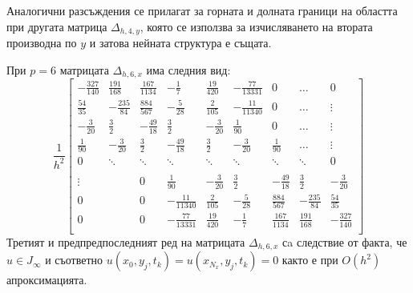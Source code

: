 \documentclass{article}
\begin{document}
Аналогични разсъждения се прилагат за горната и долната граници на областта при другата матрица $\Delta_{h,4,y}$, която се използва за изчисляването на втората производна по $y$ и затова нейната структура е същата.

При $p=6$ матрицата $\Delta_{h,6,x}$ има следния вид:
\[
\frac{1}{h^2}
\begin{bmatrix}
   -\frac{327}{140}	& \frac{191}{168}	&   \frac{167}{1134}	& -\frac{1}{7}    		 & \frac{19}{420}	& -\frac{77}{13331}   &    0      	   	&   \dots           & 0    \\
    \frac{54}{35}    	&-\frac{235}{84}   	&    \frac{884}{567}    &-\frac{5}{28}  	 	& \frac{2}{105}		&  -\frac{11}{11340}	 &   0      	   	&   \dots	       & \vdots  \\
    -\frac{3}{20}		& \frac{3}{2}         	& -\frac{49}{18} 	&  \frac{3}{2}		&  -\frac{3}{20}    	 &   \frac{1}{90}    	 &  0			&     \dots         &\vdots    \\
    \frac{1}{90}		& -\frac{3}{20}		& \frac{3}{2}         	& -\frac{49}{18} 	&  \frac{3}{2}		&  -\frac{3}{20}    	 &   \frac{1}{90} &     \dots         &\vdots    \\
        0           		& \ddots        		&         \ddots           	& \ddots        		&    \ddots   		&   \ddots      		 &     \ddots    	&  \ddots          &    0 \\	
\\
   \vdots      		&            		 	&    	0	      		& \frac{1}{90}		& -\frac{3}{20}		& \frac{3}{2}         	& -\frac{49}{18}	&  \frac{3}{2}  &  -\frac{3}{20} \\
    0      			&              	 	&    0      		&   -\frac{11}{11340}	 	&    \frac{2}{105} 	&  -\frac{5}{28} 	& \frac{884}{567} &-\frac{235}{84} &  \frac{54}{35}\\
    0              	& 	          		&    0              	&  -\frac{77}{13331}    		&  \frac{19}{420}&-\frac{1}{7}	 &  \frac{167}{1134} 	& \frac{191}{168}  &  -\frac{327}{140}\\
\end{bmatrix}
\]
Третият и предпредпоследният ред на матрицата $\Delta_{h,6,x}$ сa следствие от факта, че $u \in J_\infty$ и съответно $u(x_0, y_j, t_k) = u(x_{N_x}, y_j, t_k) = 0$ както е при $O(h^2)$ апроксимацията. 
\end{document}
